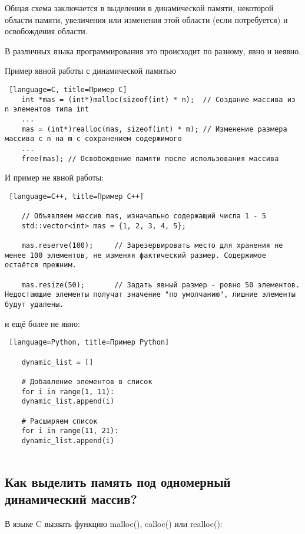 \documentclass[a4paper,12pt]{article}
\begin{document}
	Общая схема заключается в выделении в динамической памяти, некоторой области памяти, увеличения или изменения этой области (если потребуется) и освобождения области.
	
	В различных языка программирования это происходит по разному, явно и неявно.
	
	Пример явной работы с динамической памятью
	\begin{lstlisting} [language=C, title=Пример C]
 	int *mas = (int*)malloc(sizeof(int) * n);  // Создание массива из n элементов типа int
	...
	mas = (int*)realloc(mas, sizeof(int) * m); // Изменение размера массива с n на m с сохранением содержимого
	...
	free(mas); // Освобождение памяти после использования массива
	\end{lstlisting}
	
	И пример не явной работы:
	
	\begin{lstlisting} [language=C++, title=Пример C++]
		
	// Объявляем массив mas, изначально содержащий числа 1 - 5
	std::vector<int> mas = {1, 2, 3, 4, 5};
		
	mas.reserve(100);     // Зарезервировать место для хранения не менее 100 элементов, не изменяя фактический размер. Содержимое остаётся прежним.
	
	mas.resize(50);       // Задать явный размер - ровно 50 элементов. Недостающие элементы получат значение "по умолчанию", лишние элементы будут удалены.

	\end{lstlisting}
	
	и ещё более не явно:
	
	\begin{lstlisting} [language=Python, title=Пример Python]
	 
	dynamic_list = []
	
	# Добавление элементов в список
	for i in range(1, 11):
	dynamic_list.append(i)
	
	# Расширяем список
	for i in range(11, 21):
	dynamic_list.append(i)
	

	\end{lstlisting}
	
	\subsection{Как выделить память под одномерный динамический массив?}
	
	В языке C вызвать функцию malloc(), calloc() или realloc():
	
\end{document}
